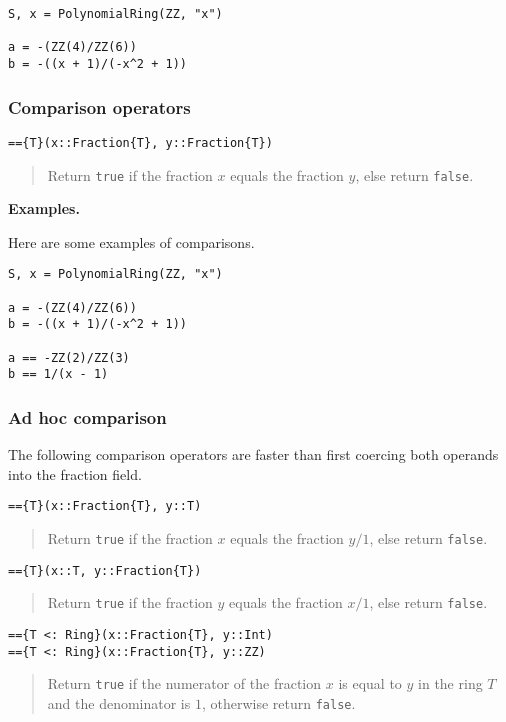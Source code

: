 \documentclass[a4paper,10pt]{article}
\newcommand{\code}{\lstinline}
\newcommand{\desc}[1]{\vspace{-3mm}\begin{quote}#1\end{quote}}
\begin{document}
{{{\begin{lstlisting}
S, x = PolynomialRing(ZZ, "x")

a = -(ZZ(4)/ZZ(6))
b = -((x + 1)/(-x^2 + 1))
\end{lstlisting}

\subsubsection{Comparison operators}

\begin{lstlisting}
=={T}(x::Fraction{T}, y::Fraction{T})
\end{lstlisting}

\desc{Return \code{true} if the fraction $x$ equals the fraction $y$, else
return \code{false}.}

\textbf{Examples.}

Here are some examples of comparisons.

\begin{lstlisting}
S, x = PolynomialRing(ZZ, "x")

a = -(ZZ(4)/ZZ(6))
b = -((x + 1)/(-x^2 + 1))

a == -ZZ(2)/ZZ(3)
b == 1/(x - 1)
\end{lstlisting}

\subsubsection{Ad hoc comparison}

The following comparison operators are faster than first coercing both
operands into the fraction field.

\begin{lstlisting}
=={T}(x::Fraction{T}, y::T)
\end{lstlisting}

\desc{Return \code{true} if the fraction $x$ equals the fraction $y/1$, else
return \code{false}.}

\begin{lstlisting}
=={T}(x::T, y::Fraction{T})
\end{lstlisting}

\desc{Return \code{true} if the fraction $y$ equals the fraction $x/1$, else
return \code{false}.}

\begin{lstlisting}
=={T <: Ring}(x::Fraction{T}, y::Int)
=={T <: Ring}(x::Fraction{T}, y::ZZ)
\end{lstlisting}

\desc{Return \code{true} if the numerator of the fraction $x$ is equal to $y$
in the ring $T$ and the denominator is $1$, otherwise return \code{false}.}

}}}
\end{document}
